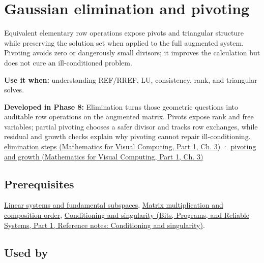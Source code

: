 \hypertarget{appendix-f6e77f4a200f}{}\label{referencestart:appendix-f6e77f4a200f}
\section{Gaussian elimination and pivoting}\label{appendix-f6e77f4a200f-gaussian-elimination-and-pivoting}

\hypertarget{appendix-f6e77f4a200f-gaussian-elimination-and-pivoting}{}

Equivalent elementary row operations expose pivots and triangular structure while preserving the solution set when applied to the full augmented system. Pivoting avoids zero or dangerously small divisors; it improves the calculation but does not cure an ill-conditioned problem.

\textbf{Use it when:} understanding REF/RREF, LU, consistency, rank, and triangular solves.

\textbf{Developed in Phase 8:} Elimination turns those geometric questions into auditable row operations on the augmented matrix. Pivots expose rank and free variables; partial pivoting chooses a safer divisor and tracks row exchanges, while residual and growth checks explain why pivoting cannot repair ill-conditioning. \href{../02-Mathematics-for-Visual-Computing-P01/main.pdf\#nameddest=01-foundations-i-ch019-elimination-turns-the-geometry-into-an-auditable-calculation}{elimination steps (Mathematics for Visual Computing, Part 1, Ch. 3)} · \href{../02-Mathematics-for-Visual-Computing-P01/main.pdf\#nameddest=01-foundations-i-ch019-pivoting-separates-algorithm-failure-from-matrix-failure}{pivoting and growth (Mathematics for Visual Computing, Part 1, Ch. 3)}

\subsection{Prerequisites}\label{appendix-f6e77f4a200f-prerequisites}

\hypertarget{appendix-f6e77f4a200f-prerequisites}{}

\hyperref[appendix-8572a4a060c1]{Linear systems and fundamental subspaces}, \hyperref[appendix-ab31ef447dbf]{Matrix multiplication and composition order}, \href{../01-Bits-Programs-and-Reliable-Systems-P01/main.pdf\#nameddest=appendix-8f6a01f284a7}{Conditioning and singularity (Bits, Programs, and Reliable Systems, Part 1, Reference notes: Conditioning and singularity)}.

\subsection{Used by}\label{appendix-f6e77f4a200f-used-by}

